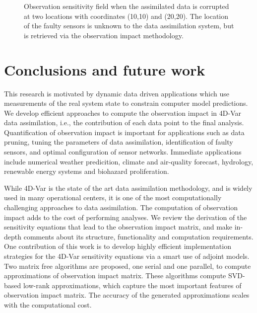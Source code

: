 \documentclass[final,sort&compress]{elsarticle}
\begin{document}
\begin{figure}
\setcounter{subfigure}{0}
\centering
{}
\caption{Observation sensitivity field when the assimilated data is corrupted at two locations with coordinates (10,10) and (20,20).
The location of the faulty sensors is unknown to the data assimilation system, but is retrieved via the observation impact methodology.}
\label{fig:faultysens}
\end{figure}



\section{Conclusions and future work}\label{sec:concl}


This research is motivated by dynamic data driven applications which use measurements of 
the real system state to constrain computer model predictions. 
We develop efficient approaches to compute
the observation impact in 4D-Var data assimilation, i.e., the contribution of each data point to the final analysis.
Quantification of observation impact is important for applications such as data pruning, 
tuning the parameters of data assimilation,
identification of faulty sensors, and optimal configuration of sensor networks.
Immediate applications include  numerical weather predicition,
climate and air-quality forecast, hydrology, renewable energy systems and biohazard proliferation.

While 4D-Var is the state of the art data assimilation methodology, and is widely used in many operational centers, it is one of the most computationally challenging approaches to data assimilation. The computation of observation impact adds to the cost of performing analyses.
We review the derivation of the sensitivity equations that lead to the observation impact matrix,
and make in-depth comments about its structure, functionality and computation requirements.
One contribution of this work is to develop highly efficient implementation strategies for the
4D-Var sensitivity equations via a smart use of adjoint models. Two matrix free algorithms are proposed, one
serial and one parallel, to compute approximations of observation impact matrix.
These algorithms compute SVD-based low-rank approximations, which capture the most important features of observation impact matrix.
The accuracy of the generated approximations scales with the computational cost.
\end{document}
